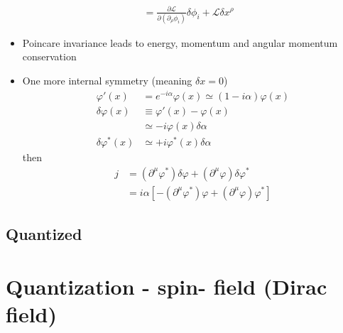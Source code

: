 \documentclass[10pt,a4paper]{report}
\theoremstyle{definition}
\begin{document}
\begin{enumerate}[a)]
\begin{align}
&=\frac{\partial\mathcal{L}}{\partial(\partial_\rho\phi_i)}\delta\phi_i+\mathcal{L}\delta x^\rho
\end{align}
\begin{itemize}
\item Poincare invariance leads to energy, momentum and angular momentum conservation
\item One more internal symmetry (meaning $\delta x=0$)
\begin{align}
\varphi'(x)&=e^{-i\alpha}\varphi(x)\simeq(1-i\alpha)\varphi(x)\\
\delta\varphi(x)
&\equiv\varphi'(x)-\varphi(x)\\
&\simeq-i\varphi(x)\delta\alpha\\
\delta\varphi^*(x)
&\simeq+i\varphi^*(x)\delta\alpha
\end{align}
then
\begin{align}
j
&=(\partial^\mu\varphi^*)\delta\varphi+(\partial^\mu\varphi)\delta\varphi^*\\
&=i\alpha[-(\partial^\mu\varphi^*)\varphi+(\partial^\mu\varphi)\varphi^*]
\end{align}
\end{itemize}

\end{enumerate}


\subsection{Quantized}

\newpage
\section{Quantization - spin- field (Dirac field)} 
\end{document}
